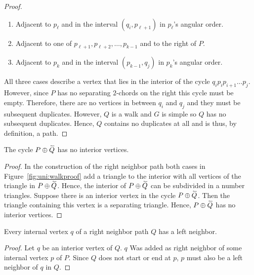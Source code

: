 \begin{proof}
      \begin{enumerate}
        \item Adjacent to $p_\ell$ and in the interval $(q_i, p_{\ell+1})$ in $p_\ell$'s angular order.
        \item Adjacent to one of $p_{\ell+1},  p_{\ell+2},\ldots, p_{k-1}$ and to the right of $P$.
        \item Adjacent to $p_k$ and in the interval $(p_{k-1}, q_j)$ in $p_k$'s angular order.
      \end{enumerate}

      All three cases describe a vertex that lies in the interior of the cycle $q_i p_i p_{i+1} \ldots p_j$. However, since $P$ has no separating $2$-chords on the right this cycle must be empty. Therefore, there are no vertices in between $q_i$ and $q_j$ and they must be subsequent duplicates. However, $Q$ is a walk and $G$ is simple so $Q$ has no subsequent duplicates. Hence, $Q$ contains no duplicates at all and is thus, by definition, a path.
    \end{proof}

    \begin{lemma}
      \label{lm:right:neighbourwalkNoInteriorVertex}
      The cycle $P \oplus \accentset{\leftharpoonup}{Q}$ has no interior vertices.
    \end{lemma}

    \begin{proof}
      In the construction of the right neighbor path both cases in Figure~\ref{fig:uni:walkproof} add a triangle to the interior with all vertices of the triangle in $P \oplus \accentset{\leftharpoonup}{Q}$. Hence, the interior of $P \oplus \accentset{\leftharpoonup}{Q}$ can be subdivided in a number triangles.
      Suppose there is an interior vertex in the cycle $P \oplus \accentset{\leftharpoonup}{Q}$. Then the triangle containing this vertex is a separating triangle. Hence, $P \oplus \accentset{\leftharpoonup}{Q}$ has no interior vertices.
    \end{proof}

    \begin{lemma}
      \label{lm:right:leftNeighborsOfTheRightNeighborPath}
      Every internal vertex $q$ of a right neighbor path $Q$ has a left neighbor.
    \end{lemma}
    \begin{proof}
      Let $q$ be an interior vertex of $Q$.
      $q$ Was added as right neighbor of some internal vertex $p$ of $P$.
      Since $Q$ does not start or end at $p$, $p$ must also be a left neighbor of $q$ in $Q$.
    \end{proof}

